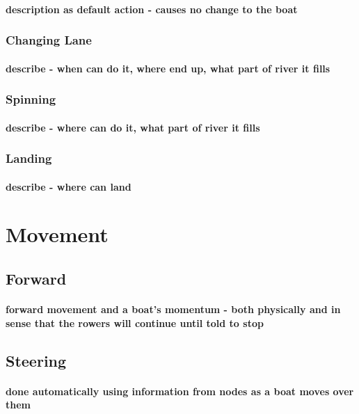         \paragraph{description as default action - causes no change to the boat}
      \subsubsection{Changing Lane}
        \paragraph{describe - when can do it, where end up, what part of river it fills}
      \subsubsection{Spinning}
        \paragraph{describe - where can do it, what part of river it fills}
      \subsubsection{Landing}
        \paragraph{describe - where can land}
    
  \section{Movement}
    \subsection{Forward}
      \paragraph{forward movement and a boat's momentum - both physically and in sense that the rowers will continue until told to stop}
    \subsection{Steering}
      \paragraph{done automatically using information from nodes as a boat moves over them}
